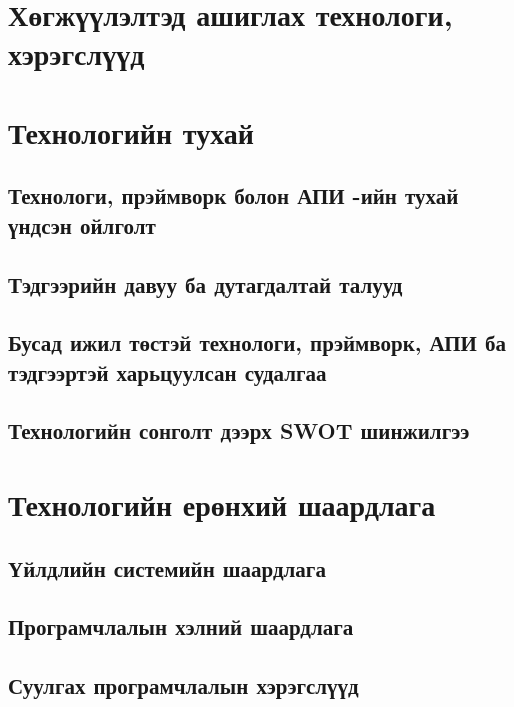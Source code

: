 
\section{Хөгжүүлэлтэд ашиглах технологи, хэрэгслүүд} %

\label{Chapter2} %

\section{Технологийн тухай}
    \subsection{Технологи, прэймворк болон АПИ -ийн тухай үндсэн ойлголт}
    \subsection{Тэдгээрийн давуу ба дутагдалтай талууд}
    \subsection{Бусад ижил төстэй технологи, прэймворк, АПИ ба тэдгээртэй харьцуулсан судалгаа}
    \subsection{Технологийн сонголт дээрх SWOT шинжилгээ}
\section{Технологийн ерөнхий шаардлага}
    \subsection{Үйлдлийн системийн шаардлага}
    \subsection{Програмчлалын хэлний шаардлага}
    \subsection{Суулгах програмчлалын хэрэгслүүд}
